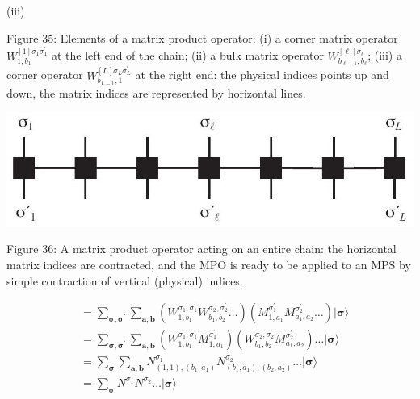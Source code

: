 \documentclass[12pt]{article}
\begin{document}
(iii)

Figure 35: Elements of a matrix product operator: (i) a corner matrix operator $W_{1, b_{1}}^{[1] \sigma_{1} \sigma_{1}^{\prime}}$ at the left end of the chain; (ii) a bulk matrix operator $W_{b_{\ell-1}, b_{\ell}}^{[\ell] \sigma_{\ell}}$; (iii) a corner operator $W_{b_{L-1}, 1}^{[L] \sigma_{L} \sigma_{L}^{\prime}}$ at the right end: the physical indices points up and down, the matrix indices are represented by horizontal lines.

\begin{center}
\includegraphics[max width=\textwidth]{2024_05_04_afc4ad226da9ccfe0ac8g-057(2)}
\end{center}

Figure 36: A matrix product operator acting on an entire chain: the horizontal matrix indices are contracted, and the MPO is ready to be applied to an MPS by simple contraction of vertical (physical) indices.

$$
\begin{aligned}
& =\sum_{\boldsymbol{\sigma}, \boldsymbol{\sigma}^{\prime}} \sum_{\boldsymbol{a}, \boldsymbol{b}}\left(W_{1, b_{1}}^{\sigma_{1}, \sigma_{1}^{\prime}} W_{b_{1}, b_{2}}^{\sigma_{2}, \sigma_{2}^{\prime}} \ldots\right)\left(M_{1, a_{1}}^{\sigma_{1}^{\prime}} M_{a_{1}, a_{2}}^{\sigma_{2}^{\prime}} \ldots\right)|\boldsymbol{\sigma}\rangle \\
& =\sum_{\boldsymbol{\sigma}, \boldsymbol{\sigma}^{\prime}} \sum_{\boldsymbol{a}, \boldsymbol{b}}\left(W_{1, b_{1}}^{\sigma_{1}, \sigma_{1}^{\prime}} M_{1, a_{1}}^{\sigma_{1}^{\prime}}\right)\left(W_{b_{1}, b_{2}}^{\sigma_{2}, \sigma_{2}^{\prime}} M_{a_{1}, a_{2}}^{\sigma_{2}^{\prime}}\right) \ldots|\boldsymbol{\sigma}\rangle \\
& =\sum_{\boldsymbol{\sigma}} \sum_{\boldsymbol{a}, \boldsymbol{b}} N_{(1,1),\left(b_{1}, a_{1}\right)}^{\sigma_{1}} N_{\left(b_{1}, a_{1}\right),\left(b_{2}, a_{2}\right)}^{\sigma_{2}} \ldots|\boldsymbol{\sigma}\rangle \\
& =\sum_{\boldsymbol{\sigma}} N^{\sigma_{1}} N^{\sigma_{2}} \ldots|\boldsymbol{\sigma}\rangle
\end{aligned}
$$
\end{document}

